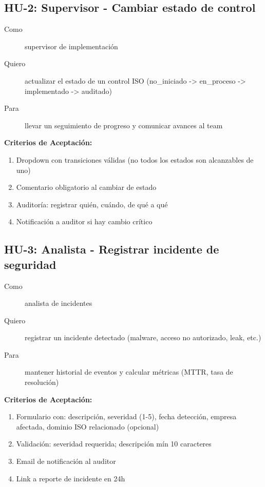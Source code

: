 \documentclass[12pt,a4paper,oneside]{article}
\begin{document}
\subsection{HU-2: Supervisor - Cambiar estado de control}

\begin{description}
  \item[Como] supervisor de implementación
  \item[Quiero] actualizar el estado de un control ISO (no\_iniciado -> en\_proceso -> implementado -> auditado)
  \item[Para] llevar un seguimiento de progreso y comunicar avances al team
\end{description}

\textbf{Criterios de Aceptación:}
\begin{enumerate}
  \item Dropdown con transiciones válidas (no todos los estados son alcanzables de uno)
  \item Comentario obligatorio al cambiar de estado
  \item Auditoría: registrar quién, cuándo, de qué a qué
  \item Notificación a auditor si hay cambio crítico
\end{enumerate}

\subsection{HU-3: Analista - Registrar incidente de seguridad}

\begin{description}
  \item[Como] analista de incidentes
  \item[Quiero] registrar un incidente detectado (malware, acceso no autorizado, leak, etc.)
  \item[Para] mantener historial de eventos y calcular métricas (MTTR, tasa de resolución)
\end{description}

\textbf{Criterios de Aceptación:}
\begin{enumerate}
  \item Formulario con: descripción, severidad (1-5), fecha detección, empresa afectada, dominio ISO relacionado (opcional)
  \item Validación: severidad requerida; descripción mín 10 caracteres
  \item Email de notificación al auditor
  \item Link a reporte de incidente en 24h
\end{enumerate}
\end{document}
